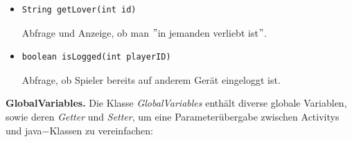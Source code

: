 \documentclass[12pt, a4paper]{article}
\begin{document}
\begin{itemize}
\item \begin{verbatim}
String getLover(int id)
\end{verbatim}
\vspace{-0.2 cm}
Abfrage und Anzeige, ob man $"$in jemanden verliebt ist$"$.

\item \begin{verbatim}
boolean isLogged(int playerID)
\end{verbatim}
\vspace{-0.2 cm}
Abfrage, ob Spieler bereits auf anderem Gerät eingeloggt ist.

\end{itemize}

\vspace{0,3 cm}

\textbf{GlobalVariables.}
Die Klasse \textit{GlobalVariables} enthält diverse globale Variablen, sowie deren \textit{Getter} und \textit{Setter}, um eine Parameterübergabe zwischen Activitys und java$-$Klassen zu vereinfachen:
\end{document}
